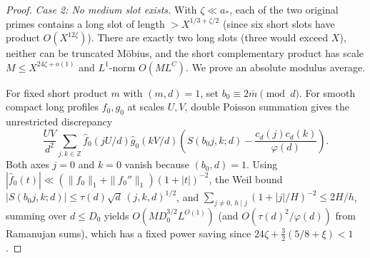 \documentclass[11pt,reqno]{amsart}
\theoremstyle{remark}
\numberwithin{equation}{section}
\begin{document}
\begin{proof}
\smallskip
\noindent\emph{Case 2: No medium slot exists.} With $\zeta \ll a_*$, each of the two original primes contains a long slot of length $> X^{1/3+\zeta/2}$ (since six short slots have product $O(X^{12\zeta})$). There are exactly two long slots (three would exceed $X$), neither can be truncated M\"obius, and the short complementary product has scale $M \le X^{24\zeta+o(1)}$ and $L^1$-norm $O(ML^C)$. We prove an absolute modulus average.

For fixed short product $m$ with $(m,d)=1$, set $b_0 \equiv 2\bar m \pmod d$. For smooth compact long profiles $f_0,g_0$ at scales $U,V$, double Poisson summation gives the unrestricted discrepancy
\begin{equation}\label{eq:poisson2}
\frac{UV}{d^2}\sum_{j,k\in\mathbb{Z}}\widehat f_0(jU/d)\widehat g_0(kV/d)
\left(S(b_0 j, k; d) - \frac{c_d(j)c_d(k)}{\varphi(d)}\right).
\end{equation}
Both axes $j=0$ and $k=0$ vanish because $(b_0,d)=1$. Using $|\widehat f_0(t)| \ll (\|f_0\|_1 + \|f_0''\|_1)(1+|t|)^{-2}$, the Weil bound $|S(b_0 j, k; d)| \le \tau(d)\sqrt{d}\,(j,k,d)^{1/2}$, and $\sum_{j \ne 0,\, h\mid j}(1+|j|/H)^{-2} \le 2H/h$, summing over $d \le D_0$ yields $O(M D_0^{3/2} L^{O(1)})$ (and $O(\tau(d)^2/\varphi(d))$ from Ramanujan sums), which has a fixed power saving since $24\zeta + \tfrac{3}{2}(5/8+\xi) < 1$.


\end{proof}
\end{document}
